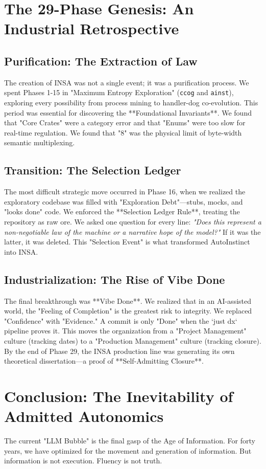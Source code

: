 \documentclass[12pt,a4paper,oneside]{book}
\begin{document}
\chapter{The 29-Phase Genesis: An Industrial Retrospective}

\section{Purification: The Extraction of Law}
The creation of INSA was not a single event; it was a purification process. We spent Phases 1-15 in "Maximum Entropy Exploration" (\texttt{ccog} and \texttt{ainst}), exploring every possibility from process mining to handler-dog co-evolution. This period was essential for discovering the **Foundational Invariants**. We found that "Core Crates" were a category error and that "Enums" were too slow for real-time regulation. We found that "8" was the physical limit of byte-width semantic multiplexing.

\section{Transition: The Selection Ledger}
The most difficult strategic move occurred in Phase 16, when we realized the exploratory codebase was filled with "Exploration Debt"---stubs, mocks, and "looks done" code. We enforced the **Selection Ledger Rule**, treating the repository as raw ore. We asked one question for every line: \textit{"Does this represent a non-negotiable law of the machine or a narrative hope of the model?"} If it was the latter, it was deleted. This "Selection Event" is what transformed AutoInstinct into INSA.

\section{Industrialization: The Rise of Vibe Done}
The final breakthrough was **Vibe Done**. We realized that in an AI-assisted world, the "Feeling of Completion" is the greatest risk to integrity. We replaced "Confidence" with "Evidence." A commit is only "Done" when the `just dx` pipeline proves it. This moves the organization from a "Project Management" culture (tracking dates) to a "Production Management" culture (tracking closure). By the end of Phase 29, the INSA production line was generating its own theoretical dissertation---a proof of **Self-Admitting Closure**.

\chapter{Conclusion: The Inevitability of Admitted Autonomics}
The current "LLM Bubble" is the final gasp of the Age of Information. For forty years, we have optimized for the movement and generation of information. But information is not execution. Fluency is not truth. 
\end{document}
